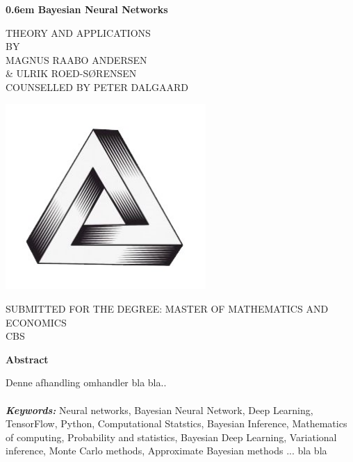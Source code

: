 \documentclass[a4paper]{book}
\providecommand{\keywords}[1]
{
  \small	
  \textbf{\textit{Keywords:}} #1
}
\numberwithin{mytheorem}{chapter}
\numberwithin{equation}{section}
\begin{document}
\begin{titlepage}
\clearpage
\newcommand\nbvspace[1][3]{\vspace*{\stretch{#1}}}
\newcommand\nbstretchyspace{\spaceskip0.5em plus 0.25em minus 0.25em}
\newcommand{\nbtitlestretch}{\spaceskip0.6em}
\thispagestyle{empty}
\begin{center}
	\bfseries
	\nbvspace[1]
	\Huge
	{\nbtitlestretch\huge
	 Bayesian Neural Networks}
	
	\nbvspace[1]
	\normalsize
	
	THEORY AND APPLICATIONS\\
	\nbvspace[1]
	\small BY\\
	\Large MAGNUS RAABO ANDERSEN \\ \& ULRIK ROED-SØRENSEN\\[0.5em]
	\footnotesize COUNSELLED BY PETER DALGAARD
	
	\nbvspace[2]
	
	\includegraphics[width=3in]{penrose.JPG}
	\nbvspace[3]
	
	SUBMITTED FOR THE DEGREE: MASTER OF MATHEMATICS AND ECONOMICS\\
	\large
	CBS
	\nbvspace[1]
\end{center}
\end{titlepage}

\thispagestyle{empty}
\begin{center}
    \Large
    \textbf{Abstract}
\end{center}
\vspace{0.9cm}
Denne afhandling omhandler bla bla.. %
\\
\\
\keywords{Neural networks, Bayesian Neural Network, Deep Learning, TensorFlow, Python, Computational Statstics, Bayesian Inference, Mathematics of computing, Probability and statistics, Bayesian Deep Learning, Variational inference, Monte Carlo methods, Approximate Bayesian methods ...  bla bla}
\frontmatter
\end{document}
